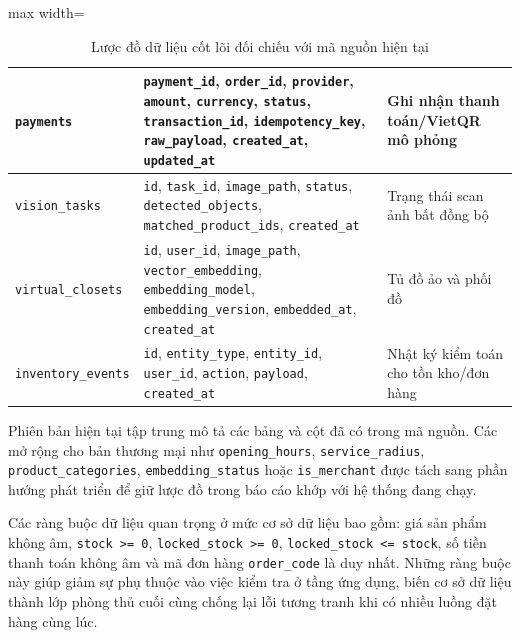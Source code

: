 \documentclass[12pt, a4paper]{article}
\begin{document}
\begin{table}[H]
\begin{adjustbox}{max width=\textwidth}
\begin{tabular}{|>{\raggedright\arraybackslash}p{3.0cm}|>{\raggedright\arraybackslash}p{9.3cm}|>{\raggedright\arraybackslash}p{3.2cm}|}
\texttt{payments} & \texttt{payment\_id}, \texttt{order\_id}, \texttt{provider}, \texttt{amount}, \texttt{currency}, \texttt{status}, \texttt{transaction\_id}, \texttt{idempotency\_key}, \texttt{raw\_payload}, \texttt{created\_at}, \texttt{updated\_at} & Ghi nhận thanh toán/VietQR mô phỏng \\ \hline
\texttt{vision\_tasks} & \texttt{id}, \texttt{task\_id}, \texttt{image\_path}, \texttt{status}, \texttt{detected\_objects}, \texttt{matched\_product\_ids}, \texttt{created\_at} & Trạng thái scan ảnh bất đồng bộ \\ \hline
\texttt{virtual\_closets} & \texttt{id}, \texttt{user\_id}, \texttt{image\_path}, \texttt{vector\_embedding}, \texttt{embedding\_model}, \texttt{embedding\_version}, \texttt{embedded\_at}, \texttt{created\_at} & Tủ đồ ảo và phối đồ \\ \hline
\texttt{inventory\_events} & \texttt{id}, \texttt{entity\_type}, \texttt{entity\_id}, \texttt{user\_id}, \texttt{action}, \texttt{payload}, \texttt{created\_at} & Nhật ký kiểm toán cho tồn kho/đơn hàng \\ \hline
\end{tabular}
\end{adjustbox}
\caption{Lược đồ dữ liệu cốt lõi đối chiếu với mã nguồn hiện tại}
\label{tab:code_aligned_schema}
\end{table}

Phiên bản hiện tại tập trung mô tả các bảng và cột đã có trong mã nguồn. Các mở rộng cho bản thương mại như \texttt{opening\_hours}, \texttt{service\_radius}, \texttt{product\_categories}, \texttt{embedding\_status} hoặc \texttt{is\_merchant} được tách sang phần hướng phát triển để giữ lược đồ trong báo cáo khớp với hệ thống đang chạy.

Các ràng buộc dữ liệu quan trọng ở mức cơ sở dữ liệu bao gồm: giá sản phẩm không âm, \texttt{stock >= 0}, \texttt{locked\_stock >= 0}, \texttt{locked\_stock <= stock}, số tiền thanh toán không âm và mã đơn hàng \texttt{order\_code} là duy nhất. Những ràng buộc này giúp giảm sự phụ thuộc vào việc kiểm tra ở tầng ứng dụng, biến cơ sở dữ liệu thành lớp phòng thủ cuối cùng chống lại lỗi tương tranh khi có nhiều luồng đặt hàng cùng lúc.
\end{document}

